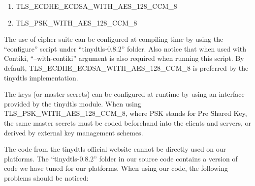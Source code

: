 \begin{enumerate}
	\item TLS\_ECDHE\_ECDSA\_WITH\_AES\_128\_CCM\_8\cite{rfc7251}
	\item TLS\_PSK\_WITH\_AES\_128\_CCM\_8\cite{rfc6655}
\end{enumerate}

The use of cipher suite can be configured at compiling time by using the ``configure'' script under ``tinydtls-0.8.2'' folder. Also notice that when used with Contiki, ``--with-contiki'' argument is also required when running this script. By default, TLS\_ECDHE\_ECDSA\_WITH\_AES\_128\_CCM\_8 is preferred by the tinydtls implementation.

The keys (or master secrets) can be configured at runtime by using an interface provided by the tinydtls module. When using TLS\_PSK\_WITH\_AES\_128\_CCM\_8, where PSK stands for Pre Shared Key, the same master secrets must be coded beforehand into the clients and servers, or derived by external key management schemes.

The code from the tinydtls official website cannot be directly used on our platforms. The ``tinydtls-0.8.2'' folder in our source code contains a version of code we have tuned for our platforms. When using our code, the following problems should be noticed:

